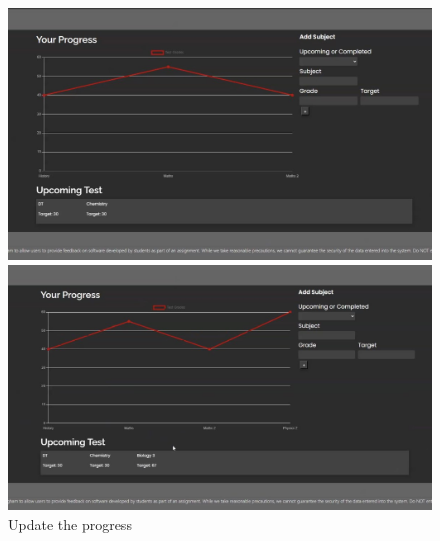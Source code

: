 \documentclass[a4paper]{article}
\begin{document}
\begin{figure}[H]
  \centering
  \begin{minipage}{0.49\textwidth}
    \centering
    \includegraphics[width=\linewidth]{./image/history_1.png}
  \end{minipage}\hfill
  \begin{minipage}{0.49\textwidth}
    \centering
    \includegraphics[width=\linewidth]{./image/history_2.png}
  \end{minipage}
  \caption*{Update the progress}
\end{figure}
\end{document}
